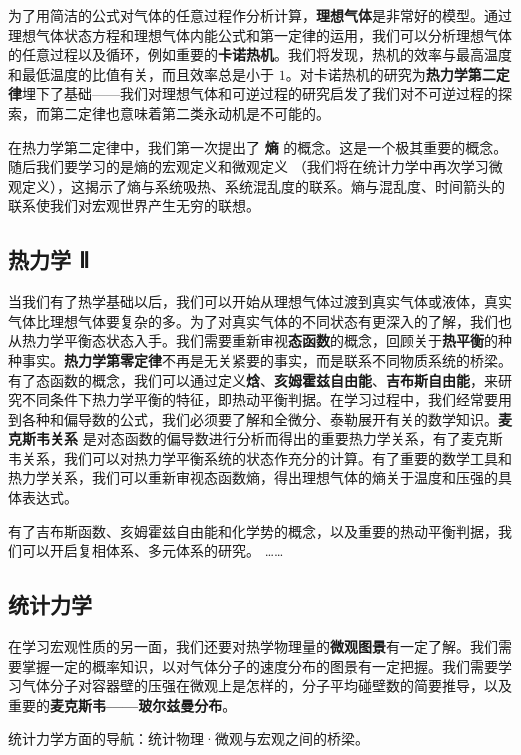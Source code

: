为了用简洁的公式对气体的任意过程作分析计算，\textbf{理想气体}是非常好的模型。通过理想气体状态方程和理想气体内能公式和第一定律的运用，我们可以分析理想气体的任意过程以及循环，例如重要的\textbf{卡诺热机}。我们将发现，热机的效率与最高温度和最低温度的比值有关，而且效率总是小于 $1$。对卡诺热机的研究为\textbf{热力学第二定律}埋下了基础——我们对理想气体和可逆过程的研究启发了我们对不可逆过程的探索，而第二定律也意味着第二类永动机是不可能的。

在热力学第二定律中，我们第一次提出了 \textbf{熵} 的概念。这是一个极其重要的概念。随后我们要学习的是熵的宏观定义和微观定义 （我们将在统计力学中再次学习微观定义），这揭示了熵与系统吸热、系统混乱度的联系。熵与混乱度、时间箭头的联系使我们对宏观世界产生无穷的联想。

\subsection{热力学 Ⅱ}

当我们有了热学基础以后，我们可以开始从理想气体过渡到真实气体或液体，真实气体比理想气体要复杂的多。为了对真实气体的不同状态有更深入的了解，我们也从热力学平衡态状态入手。我们需要重新审视\textbf{态函数}的概念，回顾关于\textbf{热平衡}的种种事实。\textbf{热力学第零定律}不再是无关紧要的事实，而是联系不同物质系统的桥梁。有了态函数的概念，我们可以通过定义\textbf{焓}、\textbf{亥姆霍兹自由能}、\textbf{吉布斯自由能}，来研究不同条件下热力学平衡的特征，即热动平衡判据。在学习过程中，我们经常要用到各种和偏导数的公式，我们必须要了解和全微分、泰勒展开有关的数学知识。\textbf{麦克斯韦关系} 是对态函数的偏导数进行分析而得出的重要热力学关系，有了麦克斯韦关系，我们可以对热力学平衡系统的状态作充分的计算。有了重要的数学工具和热力学关系，我们可以重新审视态函数熵，得出理想气体的熵关于温度和压强的具体表达式。

有了吉布斯函数、亥姆霍兹自由能和化学势的概念，以及重要的热动平衡判据，我们可以开启复相体系、多元体系的研究。
……


\subsection{统计力学}

在学习宏观性质的另一面，我们还要对热学物理量的\textbf{微观图景}有一定了解。我们需要掌握一定的概率知识，以对气体分子的速度分布的图景有一定把握。我们需要学习气体分子对容器壁的压强在微观上是怎样的，分子平均碰壁数的简要推导，以及重要的\textbf{麦克斯韦——玻尔兹曼分布}。

统计力学方面的导航：统计物理·微观与宏观之间的桥梁。

